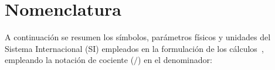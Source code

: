 \documentclass[12pt,a4paper]{article}
\begin{document}
\begingroup
\hypersetup{linkcolor=black}
\linespread{0.92}\selectfont
\tableofcontents
\endgroup
\clearpage

\begingroup
\hypersetup{linkcolor=black}
\small
\linespread{0.95}\selectfont
\setlength{\parskip}{0pt}
\listoffigures
\endgroup
\clearpage
\section{Nomenclatura}
A continuación se resumen los símbolos, parámetros físicos y unidades del Sistema Internacional (SI) empleados en la formulación de los cálculos~\cite{guia_dinamica, hibbeler2016}, empleando la notación de cociente ($/$) en el denominador:
\end{document}
